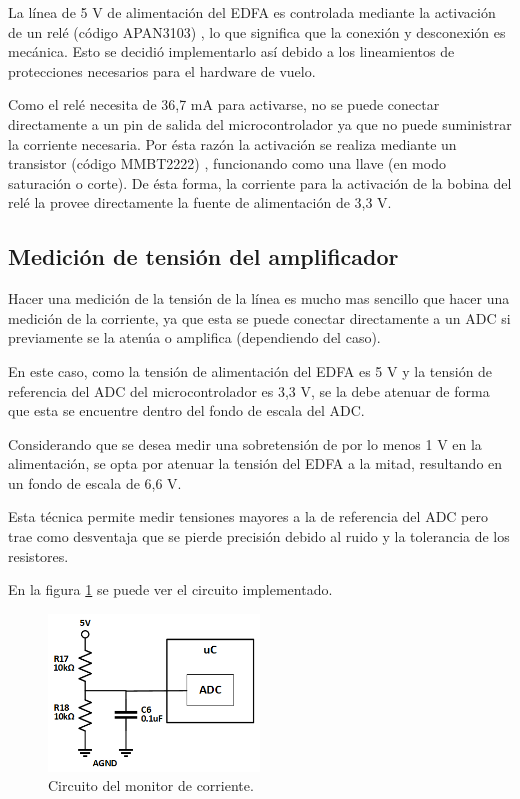 La línea de 5 V de alimentación del EDFA es controlada mediante la activación de un relé (código APAN3103) \citep{WEBSITE:RELE_DS}, lo que significa que la conexión y desconexión es mecánica. Esto se decidió implementarlo así debido a los lineamientos de protecciones necesarios para el hardware de vuelo.

Como el relé necesita de 36,7 mA para activarse, no se puede conectar directamente a un pin de salida del microcontrolador ya que no puede suministrar la corriente necesaria. Por ésta razón la activación se realiza mediante un transistor (código MMBT2222) \citep{WEBSITE:TRANS_DS}, funcionando como una llave (en modo saturación o corte). De ésta forma, la corriente para la activación de la bobina del relé la provee directamente la fuente de alimentación de 3,3 V.

\subsection{Medición de tensión del amplificador}

Hacer una medición de la tensión de la línea es mucho mas sencillo que hacer una medición de la corriente, ya que esta se puede conectar directamente a un ADC si previamente se la atenúa o amplifica (dependiendo del caso).

En este caso, como la tensión de alimentación del EDFA es 5 V y la tensión de referencia del ADC del microcontrolador es 3,3 V, se la debe atenuar de forma que esta se encuentre dentro del fondo de escala del ADC.

Considerando que se desea medir una sobretensión de por lo menos 1 V en la alimentación, se opta por atenuar la tensión del EDFA a la mitad, resultando en un fondo de escala de 6,6 V.

Esta técnica permite medir tensiones mayores a la de referencia del ADC pero trae como desventaja que se pierde precisión debido al ruido y la tolerancia de los resistores.

En la figura \ref{fig:monTension} se puede ver el circuito implementado.

\begin{figure}[H]
\centering
\includegraphics[width=0.5\textwidth]{./Figures/mon_tension.png}
\caption{Circuito del monitor de corriente.}
\label{fig:monTension}
\end{figure}

